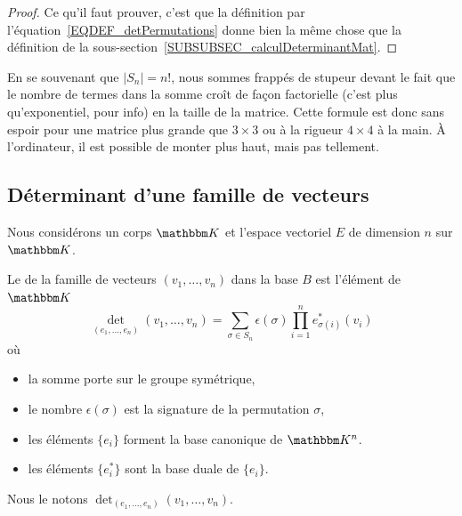 \begin{proof}
Ce qu'il faut prouver, c'est que la définition par l'équation~\eqref{EQDEF_detPermutations} donne bien la même chose que la définition de la sous-section~\ref{SUBSUBSEC_calculDeterminantMat}.
\end{proof}

En se souvenant que \( | S_n |=n!\), nous sommes frappés de stupeur devant le fait que le nombre de termes dans la somme croît de façon factorielle (c'est plus qu'exponentiel, pour info) en la taille de la matrice. Cette formule est donc sans espoir pour une matrice plus grande que \( 3\times 3\) ou à la rigueur \( 4\times 4\) à la main. À l'ordinateur, il est possible de monter plus haut, mais pas tellement.

\subsection{Déterminant d'une famille de vecteurs}

Nous considérons un corps \( \eK\) et l'espace vectoriel \( E\) de dimension \( n\) sur \( \eK\).

\begin{definition}\label{DEFooODDFooSNahPb}
    Le  de la famille de vecteurs \( (v_1,\ldots, v_n)\) dans la base \( B\) est l'élément de \( \eK\)
    \begin{equation}        \label{EQooOJEXooXUpwfZ}
        \det_{(e_1,\ldots, e_n)}(v_1,\ldots, v_n)=\sum_{\sigma\in S_n}\epsilon(\sigma)\prod_{i=1}^ne^*_{\sigma(i)}(v_i)
    \end{equation}
    où 
    \begin{itemize}
        \item 
            la somme porte sur le groupe symétrique, 
        \item
            le nombre \( \epsilon(\sigma)\) est la signature de la permutation \( \sigma\),
        \item
            les éléments \( \{ e_i \}\) forment la base canonique de \( \eK^n\).
        \item
            les éléments \( \{ e^*_i \}\) sont la base duale de \( \{ e_i \}\).
    \end{itemize}
    Nous le notons \( \det_{(e_1,\ldots, e_n)}(v_1,\ldots, v_n)\).
\end{definition}

